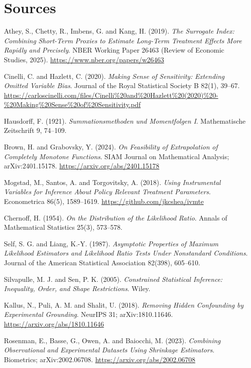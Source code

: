 \section*{Sources}
\begingroup\raggedright
\begin{enumerate}[label={[\arabic*]},leftmargin=2.5em]
\item Athey, S., Chetty, R., Imbens, G. and Kang, H. (2019). \emph{The Surrogate Index: Combining Short-Term Proxies to Estimate Long-Term Treatment Effects More Rapidly and Precisely}. NBER Working Paper 26463 (Review of Economic Studies, 2025). \url{https://www.nber.org/papers/w26463}
\item Cinelli, C. and Hazlett, C. (2020). \emph{Making Sense of Sensitivity: Extending Omitted Variable Bias}. Journal of the Royal Statistical Society B 82(1), 39--67. \url{https://carloscinelli.com/files/Cinelli%20and%20Hazlett%20(2020)%20-%20Making%20Sense%20of%20Sensitivity.pdf}
\item Hausdorff, F. (1921). \emph{Summationsmethoden und Momentfolgen I}. Mathematische Zeitschrift 9, 74--109.
\item Brown, H. and Grabovsky, Y. (2024). \emph{On Feasibility of Extrapolation of Completely Monotone Functions}. SIAM Journal on Mathematical Analysis; arXiv:2401.15178. \url{https://arxiv.org/abs/2401.15178}
\item Mogstad, M., Santos, A. and Torgovitsky, A. (2018). \emph{Using Instrumental Variables for Inference About Policy Relevant Treatment Parameters}. Econometrica 86(5), 1589--1619. \url{https://github.com/jkcshea/ivmte}
\item Chernoff, H. (1954). \emph{On the Distribution of the Likelihood Ratio}. Annals of Mathematical Statistics 25(3), 573--578.
\item Self, S. G. and Liang, K.-Y. (1987). \emph{Asymptotic Properties of Maximum Likelihood Estimators and Likelihood Ratio Tests Under Nonstandard Conditions}. Journal of the American Statistical Association 82(398), 605--610.
\item Silvapulle, M. J. and Sen, P. K. (2005). \emph{Constrained Statistical Inference: Inequality, Order, and Shape Restrictions}. Wiley.
\item Kallus, N., Puli, A. M. and Shalit, U. (2018). \emph{Removing Hidden Confounding by Experimental Grounding}. NeurIPS 31; arXiv:1810.11646. \url{https://arxiv.org/abs/1810.11646}
\item Rosenman, E., Basse, G., Owen, A. and Baiocchi, M. (2023). \emph{Combining Observational and Experimental Datasets Using Shrinkage Estimators}. Biometrics; arXiv:2002.06708. \url{https://arxiv.org/abs/2002.06708}

\end{enumerate}
